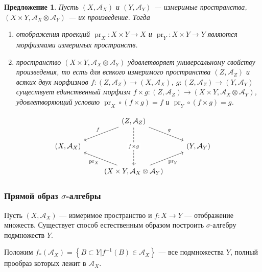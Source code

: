 \documentclass[12pt]{article}
\newtheorem{proposition}[theorem]{Предложение}
\numberwithin{theorem}{section}
\theoremstyle{definition}
\newcommand{\calA}{\mathcal{A}}
\newcommand{\pr}{\operatorname{pr}}
\newcommand{\defineset}[2]{\left\{
	\left.
	#1
	\right\vert
	#2
	\right\}}
\begin{document}
	\begin{proposition}
		Пусть $ (X, \calA_X) $ и $ (Y, \calA_Y) $ --- измеримые пространства,
		$ (X \times Y, \calA_X \otimes \calA_Y) $ --- их произведение.
		Тогда
		\begin{enumerate}
			\item отображения проекций $ \pr_X \colon X \times Y \to X $
			и $ \pr_Y \colon X \times Y \to Y $ являются морфизмами измеримых пространств.
			\item пространство $ (X \times Y, \calA_X \otimes \calA_Y) $ удовлетворяет универсальному свойству произведения,
			то есть для всякого измеримого пространства $ (Z, \calA_Z) $ 
			и всяких двух морфизмов $ f \colon (Z, \calA_Z) \to (X, \calA_X) $,
			$ g \colon (Z, \calA_Z) \to (Y, \calA_Y) $
			существует единственный морфизм $ f \times g \colon (Z, \calA_Z) \to (X \times Y, \calA_X \otimes \calA_Y) $,
			удовлетворяющий условию $ \pr_X \circ (f \times g) = f $ и $ \pr_Y \circ (f \times g) = g $.
		\end{enumerate}
		$$ \begin{tikzcd}
			& (Z, \calA_Z) \ar{dl}[above left]{f} \ar{dr}{g} \ar[dashed]{dd}[description]{f \times g} & \\
			(X, \calA_X) &  & (Y, \calA_Y) \\
			& (X \times Y, \calA_X \otimes \calA_Y) \ar{ul}{\pr_X} \ar{ur}[below right]{\pr_Y} &
		\end{tikzcd} $$
	\end{proposition}
	
	
	\subsubsection{Прямой образ $ \sigma $-алгебры}
	
	Пусть $ (X, \calA_X) $ --- измеримое пространство и $ f \colon X \to Y $ --- отображение множеств.
	Существует способ естественным образом построить $ \sigma $-алгебру подмножеств $ Y $.
	
	Положим $ f_{*}(\calA_X) = \defineset{B \subset Y}{f^{-1}(B) \in \calA_X} $ --- все подмножества $ Y $,
	полный прообраз которых лежит в $ \calA_X $.
	
\end{document}
